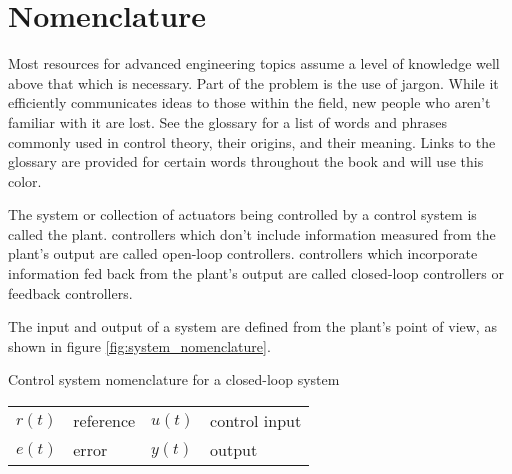 \section{Nomenclature}

Most resources for advanced engineering topics assume a level of knowledge well
above that which is necessary. Part of the problem is the use of jargon. While
it efficiently communicates ideas to those within the field, new people who
aren't familiar with it are lost. See the glossary for a list of words and
phrases commonly used in control theory, their origins, and their meaning. Links
to the glossary are provided for certain words throughout the book and will use
\textcolor{glscolor}{this color}.

The \gls{system} or collection of actuators being controlled by a
\gls{control system} is called the \gls{plant}. \Glspl{controller} which don't
include information measured from the \gls{plant}'s \gls{output} are called
open-loop \glspl{controller}. \Glspl{controller} which incorporate information
fed back from the \gls{plant}'s \gls{output} are called closed-loop
\glspl{controller} or feedback \glspl{controller}.

The \gls{input} and \gls{output} of a \gls{system} are defined from the
\gls{plant}'s point of view, as shown in figure \ref{fig:system_nomenclature}.

\begin{bookfigure}

  \caption{Control system nomenclature for a closed-loop system}
  \label{fig:system_nomenclature}

  \begin{figurekey}
    \begin{tabulary}{\linewidth}{LLLL}
      $r(t)$ & \gls{reference} & $u(t)$ & \gls{control input} \\
      $e(t)$ & \gls{error} & $y(t)$ & \gls{output} \\
    \end{tabulary}
  \end{figurekey}
\end{bookfigure}
